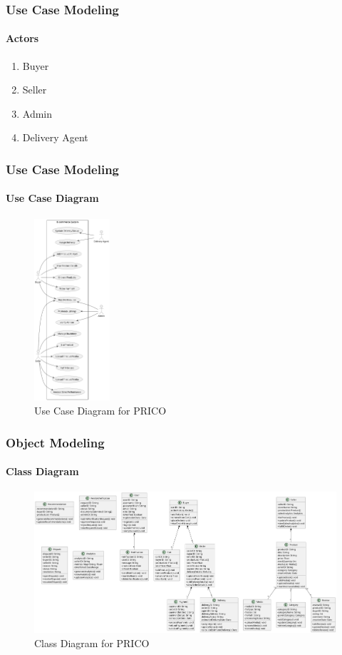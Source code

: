 \documentclass{beamer}
\begin{document}
\begin{frame}
	\frametitle{Use Case Modeling}
	\framesubtitle{Actors}
	\begin{enumerate}
		\item Buyer
		\item Seller
		\item Admin
		\item Delivery Agent
	\end{enumerate}
\end{frame}

\begin{frame}
	\frametitle{Use Case Modeling}
	\framesubtitle{Use Case Diagram}
	\begin{figure}
		\begin{center}
			\includegraphics[width=0.25\textwidth]{diagrams/use-case}
		\end{center}
		\caption{Use Case Diagram for PRICO}\label{fig:fig1}
	\end{figure}
\end{frame}

\begin{frame}
	\frametitle{Object Modeling}
	\framesubtitle{Class Diagram}
	\begin{figure}
		\begin{center}
			\includegraphics[width=1\textwidth]{diagrams/class}
		\end{center}
		\caption{Class Diagram for PRICO}\label{fig:fig2}
	\end{figure}
\end{frame}
\end{document}
